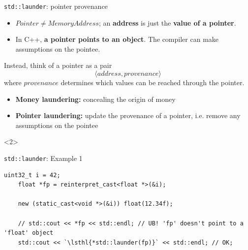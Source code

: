\begin{frame}{\texttt{std::launder}: pointer provenance}
  \begin{itemize}
  \item $Pointer \neq MemoryAddress$; an \textbf{address} is just the \textbf{value of a pointer}.

  \item In C++, \textbf{a pointer points to an object}. The compiler can make assumptions on the pointee.
  \end{itemize}

  Instead, think of a pointer as a pair
  \begin{equation*}
    \langle address, provenance \rangle
  \end{equation*}
  where $provenance$ determines which values can be reached through the pointer.
  \vfill
  \pause

  \begin{itemize}
  \item \textbf{Money laundering:} concealing the origin of money
  \item \textbf{Pointer laundering:} update the provenance of a pointer, i.e. remove any assumptions on the pointee
  \end{itemize}

  \begin{onlyenv}<2>
  \end{onlyenv}
\end{frame}

\begin{frame}[fragile]{\texttt{std::launder}: Example 1}
  \begin{lstlisting}[style=c++]
    uint32_t i = 42;
    float *fp = reinterpret_cast<float *>(&i);

    new (static_cast<void *>(&i)) float(12.34f);

    // std::cout << *fp << std::endl; // UB! 'fp' doesn't point to a 'float' object
    std::cout << `\lsthl{*std::launder(fp)}` << std::endl; // OK; 
  \end{lstlisting}
\end{frame}

